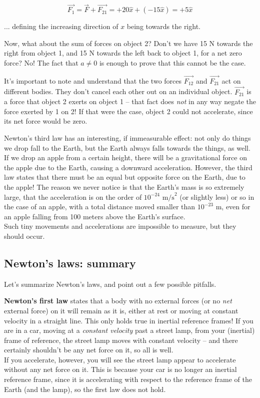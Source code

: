 \documentclass[8.01x]{subfiles}
\begin{document}
\begin{equation}
\vec{F_1} = \vec{F} + \vec{F_{21}} = +20\hat{x} + (-15\hat{x}) = +5 \hat{x}
\end{equation}

... defining the increasing direction of $x$ being towards the right.

Now, what about the sum of forces on object 2? Don't we have 15 N towards the right from object 1, and 15 N towards the left back to object 1, for a net zero force? No! The fact that $a \neq 0$ is enough to prove that this cannot be the case.

It's important to note and understand that the two forces $\vec{F_{12}}$ and $\vec{F_{21}}$ act on different bodies. They don't cancel each other out on an individual object. $\vec{F_{21}}$ is a force that object 2 exerts on object 1 -- that fact does \emph{not} in any way negate the force exerted by 1 on 2! If that were the case, object 2 could not accelerate, since its net force would be zero.

Newton's third law has an interesting, if immeasurable effect: not only do things we drop fall to the Earth, but the Earth always falls towards the things, as well. If we drop an apple from a certain height, there will be a gravitational force on the apple due to the Earth, causing a downward acceleration. However, the third law states that there must be an equal but opposite force on the Earth, due to the apple! The reason we never notice is that the Earth's mass is so extremely large, that the acceleration is on the order of $10^{-24} \text{ m/s}^2$ (or slightly less) or so in the case of an apple, with a total distance moved smaller than $10^{-23}$ m, even for an apple falling from 100 meters above the Earth's surface.\\
Such tiny movements and accelerations are impossible to measure, but they should occur.


\subsection{Newton's laws: summary}

Let's summarize Newton's laws, and point out a few possible pitfalls.

\textbf{Newton's first law} states that a body with no external forces (or no \emph{net} external force) on it will remain as it is, either at rest or moving at constant velocity in a straight line. This only holds true in inertial reference frames! If you are in a car, moving at a \emph{constant velocity} past a street lamp, from your (inertial) frame of reference, the street lamp moves with constant velocity -- and there certainly shouldn't be any net force on it, so all is well.\\
If you accelerate, however, you will see the street lamp appear to accelerate without any net force on it. This is because your car is no longer an inertial reference frame, since it is accelerating with respect to the reference frame of the Earth (and the lamp), so the first law does not hold.
\end{document}

